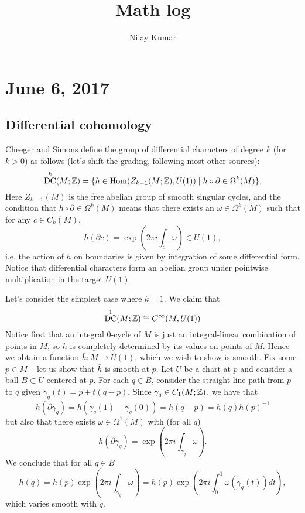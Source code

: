 \documentclass{amsart}
\title{Math log}
\author{Nilay Kumar}
\DeclareMathOperator{\DC}{DC} %
\begin{document}
\maketitle
\tableofcontents

\section{June 6, 2017}

\subsection{Differential cohomology}
Cheeger and Simons \cite{cheeger-simons} define the group of differential characters
of degree $k$ (for $k>0$) as follows (let's shift the grading, following most other sources):
\begin{equation*}
    \DC^k(M; \Z) = \{h \in \Hom(Z_{k-1}(M; \Z), U(1)) \mid h\circ\partial \in \Omega^k(M) \}.
\end{equation*}
Here $Z_{k-1}(M)$ is the free abelian group of smooth singular cycles,
and the condition
that $h\circ\partial \in \Omega^k(M)$ means that there exists an $\omega\in\Omega^k(M)$ such
that for any $c\in C_k(M)$,
\begin{equation*}
    h(\partial c) = \exp\left(2\pi i\int_c \omega\right) \in U(1),
\end{equation*}
i.e. the action of $h$ on boundaries is given by integration of some differential
form. 
Notice that differential characters form an abelian group under pointwise multiplication
in the target $U(1)$.

Let's consider the simplest case where $k=1$. We claim that
\begin{equation*}
    \DC^1(M; \Z) \cong C^\infty(M, U(1))
\end{equation*}
Notice first that an integral 0-cycle of $M$ is just an integral-linear combination of points
in $M$, so $h$ is completely determined by its values on points of $M$. Hence we obtain
a function $\bar h:M\to U(1)$, which we wish to show is smooth. Fix some $p\in M$ -- let
us show that $\bar h$ is smooth at $p$. Let $U$ be a chart at $p$ and consider a 
ball $B\subset U$ centered at $p$. For each $q\in B$, consider the straight-line path
from $p$ to $q$ given $\gamma_q(t)=p + t(q-p)$. Since $\gamma_q\in C_1(M; \mathbb{Z})$, we have
that
\begin{equation*}
    h(\partial\gamma_q) = h(\gamma_q(1)-\gamma_q(0)) = h(q - p) = h(q)h(p)^{-1}
\end{equation*}
but also that there exists $\omega\in \Omega^1(M)$ with (for all $q$)
\begin{equation*}
    h(\partial\gamma_q) = \exp\left( 2\pi i\int_{\gamma_q} \omega\right).
\end{equation*}
We conclude that for all $q\in B$
\begin{equation*}
    h(q) = h(p)\exp(2\pi i\int_{\gamma_q}\omega) =h(p)\exp(2\pi i\int_0^1\omega(\gamma_q(t)) dt),
\end{equation*}
which varies smooth with $q$.
\end{document}
